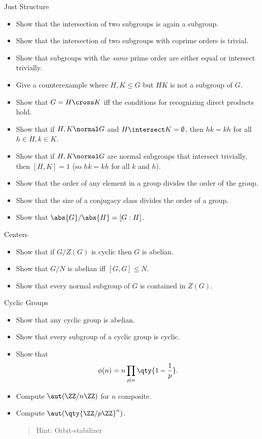 Just Structure

\begin{itemize}
\tightlist
\item
  Show that the intersection of two subgroups is again a subgroup.
\item
  Show that the intersection of two subgroups with coprime orders is
  trivial.
\item
  Show that subgroups with the \emph{same} prime order are either equal
  or intersect trivially.
\item
  Give a counterexample where \(H,K\leq G\) but \(HK\) is not a subgroup
  of \(G\).
\item
  Show that \(G=H\cross K\) iff the conditions for recognizing direct
  products hold.
\item
  Show that if \(H, K \normal G\) and \(H\intersect K = \emptyset\),
  then \(hk=kh\) for all \(h\in H,k\in K\).
\item
  Show that if \(H,K\normal G\) are normal subgroups that intersect
  trivially, then \([H, K] = 1\) (so \(hk = kh\) for all \(k\) and
  \(h\)).
\item
  Show that the order of any element in a group divides the order of the
  group.
\item
  Show that the size of a conjugacy class divides the order of a group.
\item
  Show that \(\abs{G}/\abs{H} = [G: H]\).
\end{itemize}

Centers

\begin{itemize}
\tightlist
\item
  Show that if \(G/Z(G)\) is cyclic then \(G\) is abelian.
\item
  Show that \(G/N\) is abelian iff \([G, G] \leq N\).
\item
  Show that every normal subgroup of \(G\) is contained in \(Z(G)\).
\end{itemize}

Cyclic Groups

\begin{itemize}
\item
  Show that any cyclic group is abelian.
\item
  Show that every subgroup of a cyclic group is cyclic.
\item
  Show that \[\phi(n) = n \prod_{p\mid n}\qty{1 - {1\over p}}.\]
\item
  Compute \(\aut(\ZZ/n\ZZ)\) for \(n\) composite.
\item
  Compute \(\aut(\qty{\ZZ/p\ZZ}^n)\).

  \begin{quote}
  Hint: Orbit-stabilizer
  \end{quote}
\end{itemize}

